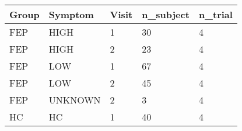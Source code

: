 \begin{tabular}{lllll}
Group & Symptom & Visit & n_subject & n_trial \\ 
\hline 
FEP & HIGH & 1 & 30 & 4 \\ 
FEP & HIGH & 2 & 23 & 4 \\ 
FEP & LOW & 1 & 67 & 4 \\ 
FEP & LOW & 2 & 45 & 4 \\ 
FEP & UNKNOWN & 2 & 3 & 4 \\ 
HC & HC & 1 & 40 & 4 \\ 
\hline 
\end{tabular}